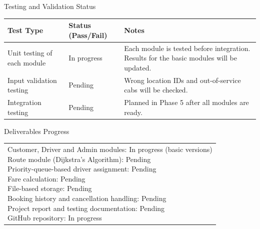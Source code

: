 \documentclass[12pt,a4paper]{article}
\newcommand{\sectiontitle}[1]{%
    {\color{GEUBlue}
    \fontsize{18}{22}\selectfont #1}
}
\newcommand{\answerbox}[2]{%
    \begin{tabularx}{\textwidth}{
        |>{\RaggedRight\arraybackslash}X|}
        \hline
        \parbox[t][#1][t]{\dimexpr\linewidth-12pt\relax}{
            \vspace{5pt}
            \fontsize{11}{13}\selectfont #2
        }\\
        \hline
    \end{tabularx}
}
\begin{document}
\vspace{0.35cm}


\sectiontitle{Testing and Validation Status}

\vspace{0.05cm}
\vspace{0.30cm}


\begin{tabularx}{\textwidth}{
|>{\RaggedRight\arraybackslash}p{}
|>{\RaggedRight\arraybackslash}p{}
|>{\RaggedRight\arraybackslash}X|
}
\hline

\textbf{Test Type} &
\textbf{Status (Pass/Fail)} &
\textbf{Notes}
\\
\hline

Unit testing of each module
&
In progress
&
Each module is tested before integration. Results for the basic modules will be updated.
\\
\hline

Input validation testing
&
Pending
&
Wrong location IDs and out-of-service cabs will be checked.
\\
\hline

Integration testing
&
Pending
&
Planned in Phase 5 after all modules are ready.
\\
\hline

\end{tabularx}

\vspace{0.65cm}

\sectiontitle{Deliverables Progress}

\vspace{0.05cm}

\vspace{0.25cm}

\answerbox{6.20cm}{
Customer, Driver and Admin modules: In progress (basic versions)\\[2pt]
Route module (Dijkstra's Algorithm): Pending\\[2pt]
Priority-queue-based driver assignment: Pending\\[2pt]
Fare calculation: Pending\\[2pt]
File-based storage: Pending\\[2pt]
Booking history and cancellation handling: Pending\\[2pt]
Project report and testing documentation: Pending\\[2pt]
GitHub repository: In progress
}
\end{document}
